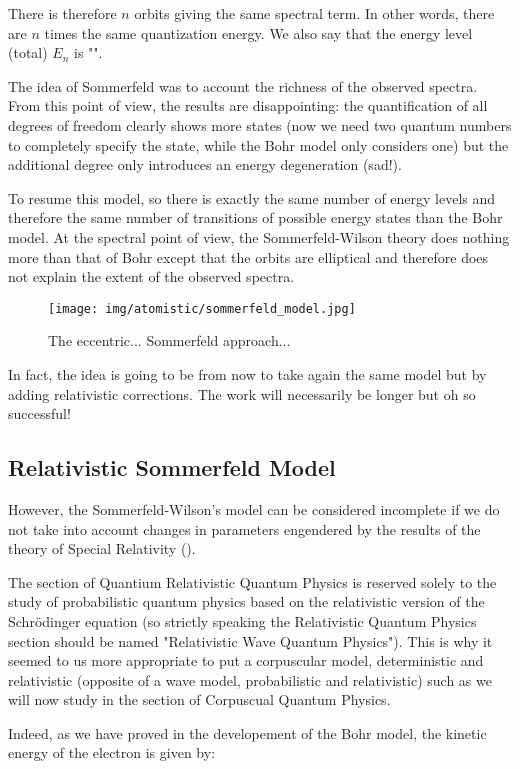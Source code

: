 	There is therefore $n$ orbits giving the same spectral term. In other words, there are $n$ times the same quantization energy. We also say that the energy level (total) $E_n$ is "".
	
	The idea of Sommerfeld was to account the richness of the observed spectra. From this point of view, the results are disappointing: the quantification of all degrees of freedom clearly shows more states (now we need two quantum numbers to completely specify the state, while the Bohr model only considers one) but the additional degree only introduces an energy degeneration (sad!).
	
	To resume this model, so there is exactly the same number of energy levels and therefore the same number of transitions of possible energy states than the Bohr model. At the spectral point of view, the Sommerfeld-Wilson theory does nothing more than that of Bohr except that the orbits are elliptical and therefore does not explain the extent of the observed spectra.
	\begin{figure}[H]
		\centering
		\texttt{[image: img/atomistic/sommerfeld\_model.jpg]}
		\caption{The eccentric... Sommerfeld approach...}
	\end{figure}
	In fact, the idea is going to be from now to take again the same model but by adding relativistic corrections. The work will necessarily be longer but oh so successful!
	
	\subsection{Relativistic Sommerfeld Model}\label{relativistic sommerfeld model}
	However, the Sommerfeld-Wilson's model can be considered incomplete if we do not take into account changes in parameters engendered by the results of the theory of Special Relativity ().
	
	\begin{tcolorbox}[title=Remark,colframe=black,arc=10pt]
	The section of Quantium Relativistic Quantum Physics is reserved solely to the study of probabilistic quantum physics based on the relativistic version of the Schrödinger equation (so strictly speaking the Relativistic Quantum Physics section should be named "Relativistic Wave Quantum Physics"). This is why it seemed to us more appropriate to put a corpuscular model, deterministic and relativistic (opposite of a wave model, probabilistic and relativistic) such as we will now study in the section of Corpuscual Quantum Physics.
	\end{tcolorbox}
	Indeed, as we have proved in the developement of the Bohr model, the kinetic energy of the electron is given by:
	
